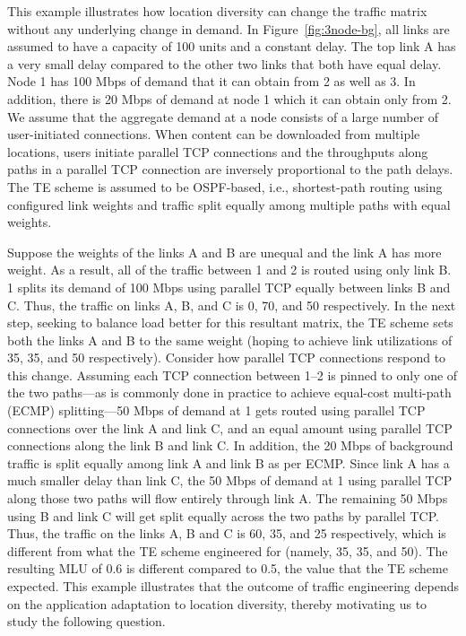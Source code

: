 This example illustrates how location diversity can change the traffic matrix without any underlying change in demand. In Figure~\ref{fig:3node-bg}, all links are assumed to have a capacity of 100 units and a constant delay. The top link A has a very small delay compared to the other two links that both have equal delay. Node 1 has 100 Mbps of demand that it can obtain from 2 as well as 3. In addition, there is 20 Mbps of demand at node 1 which it can obtain only from 2.  We assume that the aggregate demand at a node consists of a large number of user-initiated connections. When content can be downloaded from multiple locations, users initiate parallel TCP connections and the throughputs along paths in a parallel TCP connection are inversely proportional to the path delays. The TE scheme is assumed to be OSPF-based, i.e., shortest-path routing using configured link weights and traffic split equally among multiple paths with equal weights.

Suppose the weights of the links A and B are unequal and the link A has more weight. As a result, all of the traffic between 1 and 2 is routed using only link B. 1 splits its demand of 100 Mbps using parallel TCP equally between links B and C. Thus, the traffic on links A, B, and C is  0, 70, and 50 respectively. In the next step, seeking to balance load better for this resultant matrix, the TE scheme sets both the links A and B to the same weight (hoping to achieve link utilizations of 35, 35, and 50 respectively).  Consider how parallel TCP connections respond to this change. Assuming each TCP connection between 1--2 is pinned to only one of the two paths---as is commonly done in practice to achieve equal-cost multi-path (ECMP) splitting---50 Mbps of demand at 1 gets routed using parallel TCP connections over the link A and link C, and an equal amount using parallel TCP connections along the link B and link C. In addition, the 20 Mbps of background traffic is split equally among link A and link B as per ECMP.  Since link A has a much smaller delay than link C, the 50 Mbps of demand at 1 using parallel TCP along those two paths will flow entirely through link A. The remaining 50 Mbps using B and link C will get split equally across the two paths by parallel TCP. Thus, the traffic on the links A, B and C is 60, 35, and 25 respectively, which is different from what the TE scheme engineered for (namely, 35, 35, and 50). The resulting MLU of 0.6 is different compared to 0.5, the value that the TE scheme expected. This example illustrates that the outcome of traffic engineering depends on the application adaptation to location diversity, thereby motivating us to study the following question.

